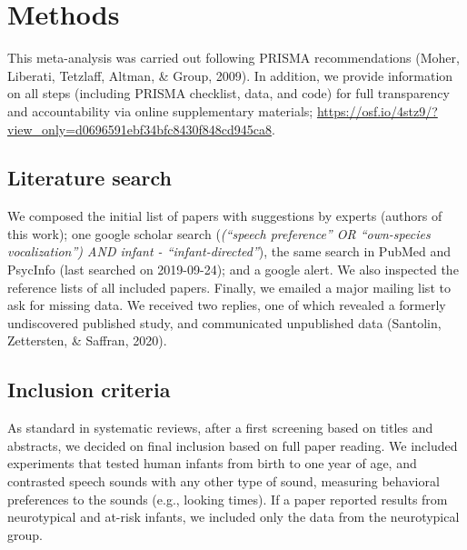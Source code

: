 \documentclass[
  man,mask,floatsintext]{apa6}
\begin{document}
\hypertarget{methods}{%
\section{Methods}\label{methods}}

This meta-analysis was carried out following PRISMA recommendations (Moher, Liberati, Tetzlaff, Altman, \& Group, 2009). In addition, we provide information on all steps (including PRISMA checklist, data, and code) for full transparency and accountability via online supplementary materials; \url{https://osf.io/4stz9/?view_only=d0696591ebf34bfc8430f848cd945ca8}.

\hypertarget{literature-search}{%
\subsection{Literature search}\label{literature-search}}

We composed the initial list of papers with suggestions by experts (authors of this work); one google scholar search (\emph{(``speech preference'' OR ``own-species vocalization'') AND infant - ``infant-directed''}), the same search in PubMed and PsycInfo (last searched on 2019-09-24); and a google alert. We also inspected the reference lists of all included papers. Finally, we emailed a major mailing list to ask for missing data. We received two replies, one of which revealed a formerly undiscovered published study, and communicated unpublished data (Santolin, Zettersten, \& Saffran, 2020).

\hypertarget{inclusion-criteria}{%
\subsection{Inclusion criteria}\label{inclusion-criteria}}

As standard in systematic reviews, after a first screening based on titles and abstracts, we decided on final inclusion based on full paper reading. We included experiments that tested human infants from birth to one year of age, and contrasted speech sounds with any other type of sound, measuring behavioral preferences to the sounds (e.g., looking times). If a paper reported results from neurotypical and at-risk infants, we included only the data from the neurotypical group.
\end{document}
